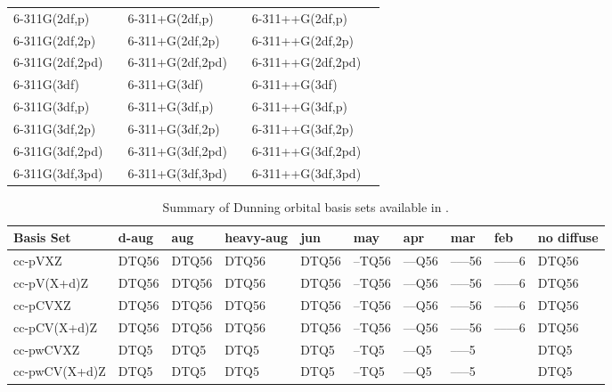\begin{table}[!htbp]
\begin{footnotesize}
\begin{center}
\begin{tabular}{llllll}
6-311G(2df,p)   &            & 6-311+G(2df,p)   &             & 6-311++G(2df,p)   &              \\
6-311G(2df,2p)  &            & 6-311+G(2df,2p)  &             & 6-311++G(2df,2p)  &              \\
6-311G(2df,2pd) &            & 6-311+G(2df,2pd) &             & 6-311++G(2df,2pd) &              \\
6-311G(3df)     &            & 6-311+G(3df)     &             & 6-311++G(3df)     &              \\
6-311G(3df,p)   &            & 6-311+G(3df,p)   &             & 6-311++G(3df,p)   &              \\
6-311G(3df,2p)  &            & 6-311+G(3df,2p)  &             & 6-311++G(3df,2p)  &              \\
6-311G(3df,2pd) &            & 6-311+G(3df,2pd) &             & 6-311++G(3df,2pd) &              \\
6-311G(3df,3pd) &            & 6-311+G(3df,3pd) &             & 6-311++G(3df,3pd) &              \\
\hline\hline
\end{tabular}
\end{center}
\end{footnotesize}
\end{table}


\begin{table}[!htbp]
\begin{footnotesize}
\caption{Summary of Dunning orbital basis sets available in \PSIfour.} \label{table:basisDunningOrbital}
\parsep 5pt
\begin{center}
\begin{tabular}{llllllllll} 
\hline\hline
Basis Set            & d-aug & aug & heavy-aug\cite{basisnote1} & jun & may & apr & mar & feb & no diffuse \\ 
\hline
cc-pVXZ              & DTQ56 & DTQ56 & DTQ56 & DTQ56 & --TQ56 & --{}--Q56 & --{}--{}--56 & --{}--{}--{}--6 & DTQ56 \\
cc-pV(X+d)Z          & DTQ56 & DTQ56 & DTQ56 & DTQ56 & --TQ56 & --{}--Q56 & --{}--{}--56 & --{}--{}--{}--6 & DTQ56 \\
cc-pCVXZ             & DTQ56 & DTQ56 & DTQ56 & DTQ56 & --TQ56 & --{}--Q56 & --{}--{}--56 & --{}--{}--{}--6 & DTQ56 \\
cc-pCV(X+d)Z         & DTQ56 & DTQ56 & DTQ56 & DTQ56 & --TQ56 & --{}--Q56 & --{}--{}--56 & --{}--{}--{}--6 & DTQ56 \\
cc-pwCVXZ            & DTQ5  & DTQ5  & DTQ5  & DTQ5  & --TQ5  & --{}--Q5  & --{}--{}--5  &                 & DTQ5  \\
cc-pwCV(X+d)Z        & DTQ5  & DTQ5  & DTQ5  & DTQ5  & --TQ5  & --{}--Q5  & --{}--{}--5  &                 & DTQ5  \\
\hline\hline
\end{tabular}
\end{center}
\end{footnotesize}
\end{table}


